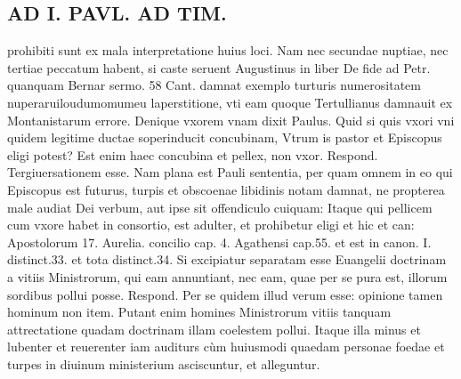 \documentclass{article}
\begin{document}
\begin{pages}
\section*{AD I. PAVL. AD TIM. }
\marginpar{[ p.110 ]}\pstart prohibiti sunt ex mala interpretatione huius loci. Nam nec secundae nuptiae, nec tertiae peccatum habent, si caste seruent Augustinus in liber  De fide ad Petr. quanquam Bernar sermo. 58 Cant. damnat exemplo turturis numerositatem nuperaruiloudumomumeu laperstitione, vti eam quoque Tertullianus damnauit ex Montanistarum errore.  \pend\pstart Denique vxorem vnam dixit Paulus. Quid si quis vxori vni quidem legitime ductae soperinducit concubinam, Vtrum is pastor et Episcopus eligi potest? Est enim haec concubina et pellex, non vxor. Respond. Tergiuersationem esse. Nam plana est Pauli sententia, per quam omnem in eo qui Episcopus est futurus, turpis et obscoenae libidinis notam damnat, ne propterea male audiat Dei verbum, aut ipse sit offendiculo cuiquam: Itaque qui pellicem cum vxore habet in consortio, est adulter, et prohibetur eligi et hic et can: Apostolorum 17. Aurelia. concilio cap. 4. Agathensi cap.55. et est in canon. I. distinct.33. et tota distinct.34.  \pend\pstart Si excipiatur separatam esse Euangelii doctrinam a vitiis Ministrorum, qui eam annuntiant, nec eam, quae per se pura est, illorum sordibus pollui posse. Respond. Per se quidem illud verum esse: opinione tamen hominum non item. Putant enim homines Ministrorum vitiis tanquam attrectatione quadam doctrinam illam coelestem pollui. Itaque illa minus et lubenter et reuerenter iam auditurs cùm huiusmodi quaedam personae foedae et turpes in diuinum ministerium asciscuntur, et alleguntur.  \pend

\end{pages}
\end{document}

